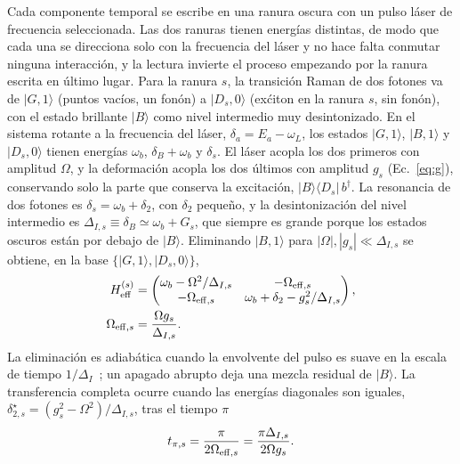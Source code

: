 \documentclass[aps,pra,twocolumn,groupedaddress,amsmath,amssymb,floatfix]{revtex4-2}
\newcommand{\ket}[1]{\lvert #1\rangle}
\newcommand{\bra}[1]{\langle #1\rvert}
\newcommand{\wb}{\omega_b}
\begin{document}
Cada componente temporal se escribe en una ranura oscura con un pulso l\'aser de frecuencia seleccionada. Las dos ranuras tienen energ\'ias distintas, de modo que cada una se direcciona solo con la frecuencia del l\'aser y no hace falta conmutar ninguna interacci\'on, y la lectura invierte el proceso empezando por la ranura escrita en \'ultimo lugar. Para la ranura $s$, la transici\'on Raman de dos fotones va de $\ket{G,1}$ (puntos vac\'ios, un fon\'on) a $\ket{D_s,0}$ (ex\'citon en la ranura $s$, sin fon\'on), con el estado brillante $\ket B$ como nivel intermedio muy desintonizado. En el sistema rotante a la frecuencia del l\'aser, $\delta_a=E_a-\omega_L$, los estados $\ket{G,1}$, $\ket{B,1}$ y $\ket{D_s,0}$ tienen energ\'ias $\wb$, $\delta_B+\wb$ y $\delta_s$. El l\'aser acopla los dos primeros con amplitud $\Omega$, y la deformaci\'on acopla los dos \'ultimos con amplitud $g_s$ (Ec.~\eqref{eq:g}), conservando solo la parte que conserva la excitaci\'on, $\ket B\bra{D_s}\,b^\dagger$. La resonancia de dos fotones es $\delta_s=\wb+\delta_2$, con $\delta_2$ peque\~no, y la desintonizaci\'on del nivel intermedio es $\Delta_{I,s}\equiv\delta_B\simeq\wb+G_s$, que siempre es grande porque los estados oscuros est\'an por debajo de $\ket B$. Eliminando $\ket{B,1}$ para $|\Omega|,|g_s|\ll\Delta_{I,s}$ se obtiene, en la base $\{\ket{G,1},\ket{D_s,0}\}$,
\begin{align}
H_{\rm eff}^{(s)}&=
\begin{pmatrix}
\wb-\Omega^2/\Delta_{I,s}&-\Omega_{{\rm eff},s}\\
-\Omega_{{\rm eff},s}&\wb+\delta_2-g_s^2/\Delta_{I,s}
\end{pmatrix},\nonumber\\
\Omega_{{\rm eff},s}&=\frac{\Omega g_s}{\Delta_{I,s}}.\label{eq:heff}
\end{align}
La eliminaci\'on es adiab\'atica cuando la envolvente del pulso es suave en la escala de tiempo $1/\Delta_I$~\cite{brion2007,reiter2012}; un apagado abrupto deja una mezcla residual de $\ket B$. La transferencia completa ocurre cuando las energ\'ias diagonales son iguales, $\delta_{2,s}^{\star}=(g_s^2-\Omega^2)/\Delta_{I,s}$, tras el tiempo $\pi$
\begin{equation}
t_{\pi,s}=\frac{\pi}{2\Omega_{{\rm eff},s}}=\frac{\pi\Delta_{I,s}}{2\Omega g_s}.\label{eq:tpi}
\end{equation}
\end{document}
